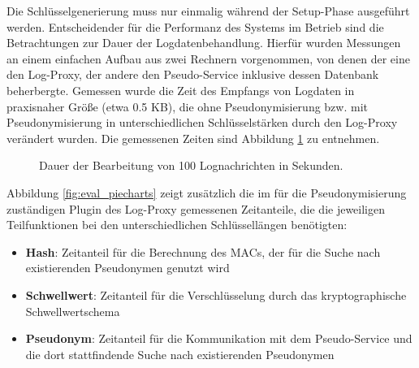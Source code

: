 Die Schlüsselgenerierung muss nur einmalig während der Setup-Phase ausgeführt werden. Entscheidender für die Performanz des Systems im Betrieb sind die Betrachtungen zur Dauer der Logdatenbehandlung. Hierfür wurden Messungen an einem einfachen Aufbau aus zwei Rechnern vorgenommen, von denen der eine den Log-Proxy, der andere den Pseudo-Service inklusive dessen Datenbank beherbergte. Gemessen wurde die Zeit des Empfangs von Logdaten in praxisnaher Größe (etwa 0.5 KB), die ohne Pseudonymisierung bzw. mit Pseudonymisierung in unterschiedlichen Schlüsselstärken durch den Log-Proxy verändert wurden. Die gemessenen Zeiten sind Abbildung \ref{fig:eval_barchart} zu entnehmen.

\begin{figure}[]
    \centering
    \caption{Dauer der Bearbeitung von 100 Lognachrichten in Sekunden.}
    \label{fig:eval_barchart}
\end{figure}

Abbildung \ref{fig:eval_piecharts} zeigt zusätzlich die im für die Pseudonymisierung zuständigen Plugin des Log-Proxy gemessenen Zeitanteile, die die jeweiligen Teilfunktionen bei den unterschiedlichen Schlüssellängen benötigten:
\begin{itemize}
  \item \textbf{Hash}: Zeitanteil für die Berechnung des MACs, der für die Suche nach existierenden Pseudonymen genutzt wird %
  \item \textbf{Schwellwert}: Zeitanteil für die Verschlüsselung durch das kryptographische Schwellwertschema %
  \item \textbf{Pseudonym}: Zeitanteil für die Kommunikation mit dem Pseudo-Service und die dort stattfindende Suche nach existierenden Pseudonymen
\end{itemize} 

